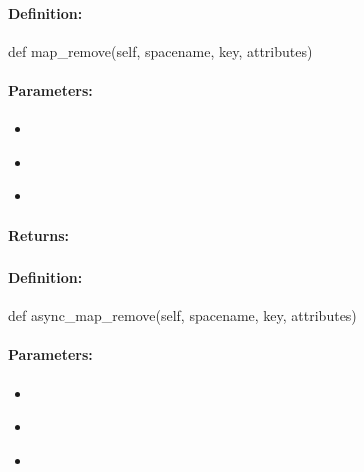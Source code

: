 \paragraph{Definition:}
\begin{pythoncode}
def map_remove(self, spacename, key, attributes)
\end{pythoncode}

\paragraph{Parameters:}
\begin{itemize}[noitemsep]
\item {}\\

\item {}\\

\item {}\\

\end{itemize}

\paragraph{Returns:}


\pagebreak
\subsubsection{}
\label{api:python:async_map_remove}


\paragraph{Definition:}
\begin{pythoncode}
def async_map_remove(self, spacename, key, attributes)
\end{pythoncode}

\paragraph{Parameters:}
\begin{itemize}[noitemsep]
\item {}\\

\item {}\\

\item {}\\

\end{itemize}


